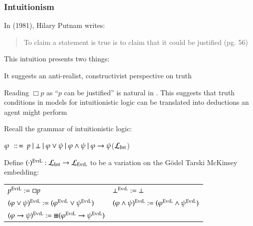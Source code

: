 \begin{frame}[allowframebreaks]
\frametitle{ Intuitionism}

In  (1981), Hilary Putnam writes:

\begin{quote}
  To claim a statement is true is to claim that it could be justified (pg. 56)
\end{quote}

This intuition presents two things:
\begin{enumeratenumeric}
  \item It suggests an anti-realist, constructivist perspective on truth
  
  \item Reading $\Box  p$ as ``$p$ can be justified'' is natural in
  . This suggests that truth conditions in models for
  intuitionistic logic can be translated into deductions an 
  agent might perform
\end{enumeratenumeric}
\framebreak

Recall the grammar of intuitionistic logic:

{\hspace*{\fill}}$\varphi \text{ } \,::\, = \text{ } p \text{ } | \text{ } \bot
\text{ } | \text{ } \varphi \vee \psi \text{ } | \text{ } \varphi \wedge \psi \text{
} | \text{ } \varphi \rightarrow
\psi${\hspace*{\fill}}($\mathcal{L}_{\operatorname{Int}}$)

\vspace{.2cm}

Define $(\cdot)^{\text{{\scshape{EviL}}}} : \text{$\mathcal{L}_{\operatorname{Int}}$}
\rightarrow \mathcal{L}_{\text{{\scshape{EviL}}}}$ to be a variation on the
G\"{o}del Tarski McKinsey embedding:

\begin{center}
  \begin{tabular}{ll}
    $p^{\text{{\scshape{EviL}}}} := \Box p$ &
    $\bot^{\text{{\scshape{EviL}}}} := \bot$\\
    $(\varphi \vee \psi)^{\text{{\scshape{EviL}}}} :=
    (\varphi^{\text{{\scshape{EviL}}}} \vee \psi^{\text{{\scshape{EviL}}}})^{}$ &
    $(\varphi \wedge \psi)^{\text{{\scshape{EviL}}}} :=
    (\varphi^{\text{{\scshape{EviL}}}} \wedge \psi^{\text{{\scshape{EviL}}}})^{}$\\
    $(\varphi \rightarrow \psi)^{\text{{\scshape{EviL}}}} := \boxplus
    (\varphi^{\text{{\scshape{EviL}}}} \rightarrow \psi^{\text{{\scshape{EviL}}}})$
    & 
  \end{tabular}
\end{center}


\end{frame}
